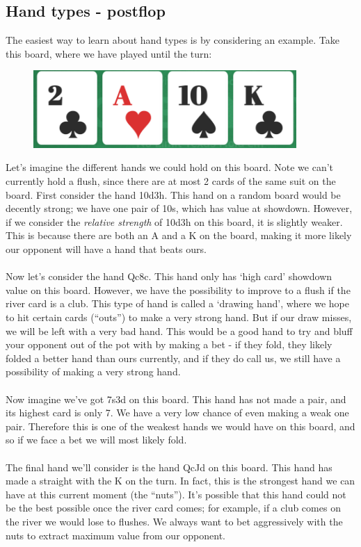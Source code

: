 \documentclass{article}
\begin{document}
\subsection{Hand types - postflop}
The easiest way to learn about hand types is by considering an example. Take this board, where we have played until the turn:
\begin{figure}[h]
    \centering
    \includegraphics[width=100mm]{images/board_1.png}
\end{figure}\newline
Let's imagine the different hands we could hold on this board. Note we can't currently hold a flush, since there are at most 2 cards of the same suit on the board. First consider the hand 10d3h. This hand on a random board would be decently strong; we have one pair of 10s, which has value at showdown. However, if we consider the \emph{relative strength} of 10d3h on this board, it is slightly weaker. This is because there are both an A and a K on the board, making it more likely our opponent will have a hand that beats ours.\\\\ Now let's consider the hand Qc8c. This hand only has `high card' showdown value on this board. However, we have the possibility to improve to a flush if the river card is a club. This type of hand is called a `drawing hand', where we hope to hit certain cards (``outs'') to make a very strong hand. But if our draw misses, we will be left with a very bad hand. This would be a good hand to try and bluff your opponent out of the pot with by making a bet - if they fold, they likely folded a better hand than ours currently, and if they do call us, we still have a possibility of making a very strong hand. \\\\
Now imagine we've got 7s3d on this board. This hand has not made a pair, and its highest card is only 7. We have a very low chance of even making a weak one pair. Therefore this is one of the weakest hands we would have on this board, and so if we face a bet we will most likely fold.\\\\
The final hand we'll consider is the hand QcJd on this board. This hand has made a straight with the K on the turn. In fact, this is the strongest hand we can have at this current moment (the ``nuts''). It's possible that this hand could not be the best possible once the river card comes; for example, if a club comes on the river we would lose to flushes. We always want to bet aggressively with the nuts to extract maximum value from our opponent. 
\end{document}
